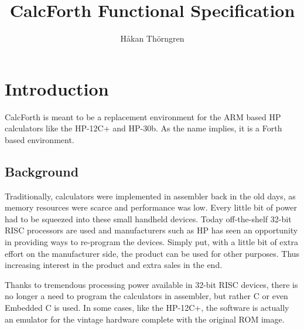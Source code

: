 \documentclass[a4paper]{article}
\begin{document}
\title{CalcForth Functional Specification}
\author{Håkan Thörngren}

 \newcommand{\CC}{C\nolinebreak\hspace{-.05em}\raisebox{.4ex}{\tiny\bf+}\nolinebreak\hspace{-.10em}\raisebox{.4ex}{\tiny\bf +}}

 \maketitle

\section{Introduction}
CalcForth is meant to be a replacement environment for the ARM based HP calculators like the HP-12C+ and HP-30b. As the name implies, it is a Forth based environment.

\subsection{Background}
Traditionally, calculators were implemented in assembler back in the old days, as memory resources were scarce and performance was low. Every little bit of power had to be squeezed into these small handheld devices. Today off-the-shelf 32-bit RISC processors are used and manufacturers such as HP has seen an opportunity in providing ways to re-program the devices. Simply put, with a little bit of extra effort on the manufacturer side, the product can be used for other purposes. Thus increasing interest in the product and extra sales in the end.

Thanks to tremendous processing power available in 32-bit RISC devices, there is no longer a need to program the calculators in assembler, but rather C or even Embedded \CC{} is used. In some cases, like the HP-12C+, the software is actually an emulator for the vintage hardware complete with the original ROM image.
\end{document}
